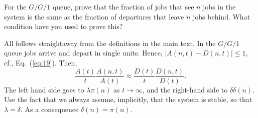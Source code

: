 \begin{exercise}
  For the $G/G/1$ queue, prove that the fraction of jobs that see $n$
  jobs in the system is the same as the fraction of departures that
  leave $n$ jobs behind. What condition have you used to prove this?
  \begin{solution}
    All follows straightaway from the definitions in the main text. In
    the $G/G/1$ queue jobs arrive and depart in single units. Hence,
    $|A(n,t)-D(n,t)|\leq 1$, cf., Eq.~(\ref{eq:19}). Then, 
    \begin{equation*}
      \frac{A(t)}{t}\frac{A(n,t)}{A(t)} \approx 
      \frac{D(t)}{t}\frac{D(n,t)}{D(t)}. 
    \end{equation*}
    The left hand side goes to $\lambda \pi(n)$ as $t\to\infty$, and
    the right-hand side to $\delta \delta(n)$. Use the fact that we
    always assume, implicitly, that the system is stable, so that
    $\lambda = \delta$. As a consequence $\delta(n) = \pi(n)$.
  \end{solution}
\end{exercise}

